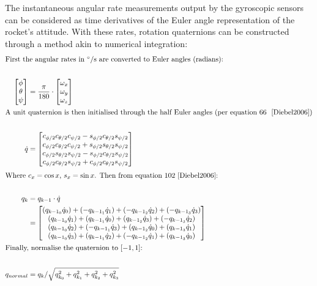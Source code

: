 The instantaneous angular rate measurements output by the gyroscopic sensors can be considered as time derivatives of the Euler angle representation of the rocket's attitude. With these rates, rotation quaternions can be constructed through a method akin to numerical integration:\\[0.5em]
{
\setlength{\belowdisplayskip}{5pt}%
\setlength{\abovedisplayskip}{-15pt}%
\begin{align*}
  \intertext{First the angular rates in $\unit{\degree}/\unit{\second}$ are converted to Euler angles (radians):}\\
  \begin{bmatrix}
    \phi\\\theta\\\psi
    \end{bmatrix} &= \frac{\pi}{180}\cdot\begin{bmatrix}
                                        \omega_x\\\omega_y\\\omega_z
                                        \end{bmatrix}\\
    \intertext{A unit quaternion is then initialised through the half Euler angles (per equation 66 ~\cite{Diebel2006})}\\
    \dot q &= 
    \begin{bmatrix}
      c_{\phi/2}c_{\theta/2}c_{\psi/2}-s_{\phi/2}c_{\theta/2}s_{\psi/2}\\
      c_{\phi/2}c_{\theta/2}c_{\psi/2}+s_{\phi/2}s_{\theta/2}s_{\psi/2}\\
      c_{\phi/2}s_{\theta/2}s_{\psi/2}-s_{\phi/2}c_{\theta/2}s_{\psi/2}\\
      c_{\phi/2}c_{\theta/2}s_{\psi/2}+c_{\phi/2}c_{\theta/2}s_{\psi/2}\\
    \end{bmatrix}\\[0.5ex]
    \intertext{Where $c_x=\cos{x}$, $s_x=\sin{x}$. Then from equation 102~\cite{Diebel2006}:}\\
    q_{k} &= q_{k-1}\cdot\dot q\\
          &= \begin{bmatrix}
            (q_{{k-1}_0}  \dot q_0) + (-q_{{k-1}_1}  \dot q_1) + (-q_{{k-1}_2}  \dot q_2) + (-q_{{k-1}_3}  \dot q_3)\\
            (q_{{k-1}_0}  \dot q_1) + (q_{{k-1}_1}  \dot q_0) + (q_{{k-1}_2}  \dot q_3) + (-q_{{k-1}_3}  \dot q_2)\\
            (q_{{k-1}_0}  \dot q_2) + (-q_{{k-1}_1}  \dot q_3) + (q_{{k-1}_2}  \dot q_0) + (q_{{k-1}_3}  \dot q_1)\\
            (q_{{k-1}_0}  \dot q_3) + (q_{{k-1}_1}  \dot q_2) + (-q_{{k-1}_2}  \dot q_1) + (q_{{k-1}_3}  \dot q_0)
             \end{bmatrix}\\
    \intertext{Finally, normalise the quaternion to $[-1,1]$:}\\
    q_{normal} &= q_{k} / \sqrt{q_{k_0}^2 + q_{k_1}^2 + q_{k_2}^2 + q_{k_3}^2}
\end{align*}
}\\

